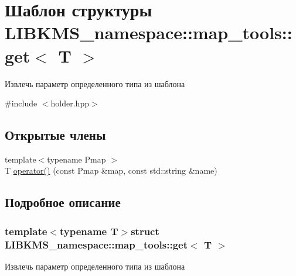 \hypertarget{structLIBKMS__namespace_1_1map__tools_1_1get}{\section{Шаблон структуры L\-I\-B\-K\-M\-S\-\_\-namespace\-:\-:map\-\_\-tools\-:\-:get$<$ T $>$}
\label{structLIBKMS__namespace_1_1map__tools_1_1get}
}


Извлечь параметр определенного типа из шаблона  




{\ttfamily \#include $<$holder.\-hpp$>$}

\subsection*{Открытые члены}
\begin{DoxyCompactItemize}
\item 
{\footnotesize template$<$typename Pmap $>$ }\\T \hyperlink{structLIBKMS__namespace_1_1map__tools_1_1get_a5f9b6ebca114f4c546cc9fab38a8a8b2}{operator()} (const Pmap \&map, const std\-::string \&name)
\end{DoxyCompactItemize}


\subsection{Подробное описание}
\subsubsection*{template$<$typename T$>$struct L\-I\-B\-K\-M\-S\-\_\-namespace\-::map\-\_\-tools\-::get$<$ T $>$}

Извлечь параметр определенного типа из шаблона 

